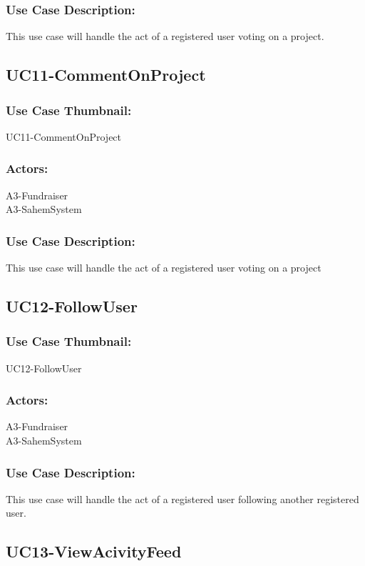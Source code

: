 \documentclass[11pt, openany]{report}
\begin{document}
\subsubsection*{Use Case Description:}
This use case will handle the act of a registered user voting on a project.

\subsection{UC11-CommentOnProject}
\label{sUC11}
\subsubsection*{Use Case Thumbnail:}
UC11-CommentOnProject
\subsubsection*{Actors:}
A3-Fundraiser\\
A3-SahemSystem

\subsubsection*{Use Case Description:}
This use case will handle the act of a registered user voting on a project

\subsection{UC12-FollowUser}
\label{sUC12}
\subsubsection*{Use Case Thumbnail:}
UC12-FollowUser
\subsubsection*{Actors:}
A3-Fundraiser\\
A3-SahemSystem

\subsubsection*{Use Case Description:}
This use case will handle the act of a registered user following another registered user.

\subsection{UC13-ViewAcivityFeed}
\label{sUC13}
\end{document}
